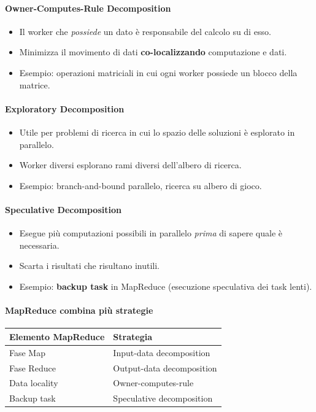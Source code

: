 \paragraph{Owner-Computes-Rule Decomposition}

\begin{itemize}
  \item Il worker che \emph{possiede} un dato è responsabile del calcolo su di esso.
  \item Minimizza il movimento di dati \textbf{co-localizzando} computazione e dati.
  \item Esempio: operazioni matriciali in cui ogni worker possiede un blocco
    della matrice.
\end{itemize}

\paragraph{Exploratory Decomposition}

\begin{itemize}
  \item Utile per problemi di ricerca in cui lo spazio delle soluzioni è esplorato
    in parallelo.
  \item Worker diversi esplorano rami diversi dell'albero di ricerca.
  \item Esempio: branch-and-bound parallelo, ricerca su albero di gioco.
\end{itemize}

\paragraph{Speculative Decomposition}

\begin{itemize}
  \item Esegue più computazioni possibili in parallelo \emph{prima} di sapere
    quale è necessaria.
  \item Scarta i risultati che risultano inutili.
  \item Esempio: \textbf{backup task} in MapReduce (esecuzione speculativa
    dei task lenti).
\end{itemize}

\paragraph{MapReduce combina più strategie}

\begin{tabular}{@{}ll@{}}
  \toprule
  \textbf{Elemento MapReduce} & \textbf{Strategia} \\
  \midrule
  Fase Map & Input-data decomposition \\
  Fase Reduce & Output-data decomposition \\
  Data locality & Owner-computes-rule \\
  Backup task & Speculative decomposition \\
  \bottomrule
\end{tabular}

